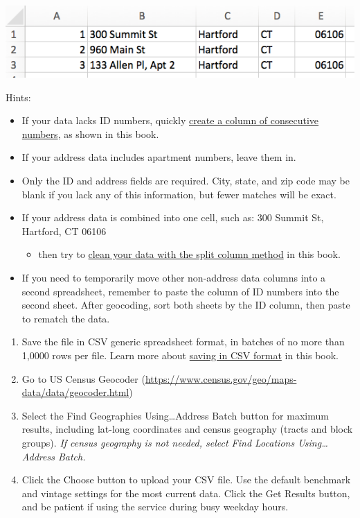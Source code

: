 \documentclass[
  english,
]{book}
\providecommand{\tightlist}{%
  \setlength{\itemsep}{0pt}\setlength{\parskip}{0pt}}
\begin{document}
\includegraphics{images/09-transform/address-no-column-headers.png}

Hints:

\begin{itemize}
\tightlist
\item
  If your data lacks ID numbers, quickly \href{calculate}{create a column of consecutive numbers}, as shown in this book.
\item
  If your address data includes apartment numbers, leave them in.
\item
  Only the ID and address fields are required. City, state, and zip code may be blank if you lack any of this information, but fewer matches will be exact.
\item
  If your address data is combined into one cell, such as: 300 Summit St, Hartford, CT 06106

  \begin{itemize}
  \tightlist
  \item
    then try to \href{clean-spreadsheets}{clean your data with the split column method} in this book.
  \end{itemize}
\item
  If you need to temporarily move other non-address data columns into a second spreadsheet, remember to paste the column of ID numbers into the second sheet. After geocoding, sort both sheets by the ID column, then paste to rematch the data.
\end{itemize}

\begin{enumerate}
\def\labelenumi{\arabic{enumi})}
\setcounter{enumi}{2}
\item
  Save the file in CSV generic spreadsheet format, in batches of no more than 1,0000 rows per file. Learn more about \href{csv}{saving in CSV format} in this book.
\item
  Go to US Census Geocoder (\url{https://www.census.gov/geo/maps-data/data/geocoder.html})
\item
  Select the Find Geographies Using\ldots Address Batch button for maximum results, including lat-long coordinates and census geography (tracts and block groups). \emph{If census geography is not needed, select Find Locations Using\ldots Address Batch.}
\item
  Click the Choose button to upload your CSV file. Use the default benchmark and vintage settings for the most current data. Click the Get Results button, and be patient if using the service during busy weekday hours.
\end{enumerate}
\end{document}
